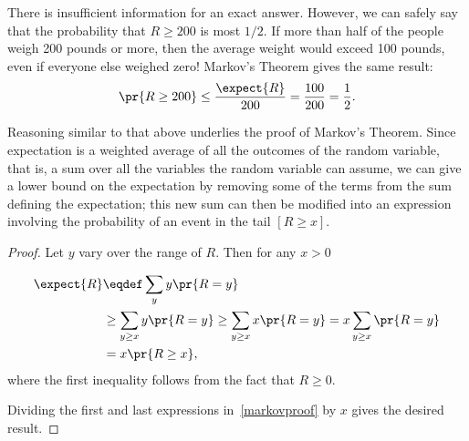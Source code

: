 \begin{editingnotes}
There is insufficient information for an exact answer.  However, we
can safely say that the probability that $R \geq 200$ is most
$1/2$.  If more than half of the people weigh 200 pounds or
more, then the average weight would exceed 100 pounds, even if
everyone else weighed zero!  Markov's Theorem gives the same result:
\begin{displaymath}
  \pr{R \geq 200} \leq \frac{\expect{R}}{200} = \frac{100}{200} = \frac{1}{2}.
\end{displaymath}

Reasoning similar to that above underlies the proof of Markov's
Theorem.  Since expectation is a weighted average of all the outcomes
of the random variable, that is, a sum over all the variables the random
variable can assume, we can give a lower bound on the expectation by
removing some of the terms from the sum defining the expectation; this
new sum can then be modified into an expression involving the
probability of an event in the tail $[R \geq x]$.

\end{editingnotes}

\begin{proof}%
Let $y$ vary over the range of $R$.  Then for any $x > 0$

\iffalse
\begin{align}
  \expect{R}
  & = \expcond{R}{R < x}\pr{R<x} + \expcond{R}{R \geq x}\pr{R \geq x}
       & \text{(total expectation)}\notag\\
  & \geq \expcond{R}{R \geq x}\pr{R \geq x}
       & \text{(because $R \geq 0$)}\notag\\
  & \geq x \pr{R \geq x}.\label{markovproof}
\end{align}
\fi
\iffalse

\begin{align}
  \expect{R}
  & \eqdef \sum_{y} y\pr{R=y}\notag\\
  & \geq \sum_{y \geq x} y\pr{R=y} & \text{(because $R \geq 0$)}\notag\\
  & \geq \sum_{y \geq x} x\pr{R=y}\notag\\
  & = x \sum_{y \geq x} \pr{R=y}\notag\\
  & = x \pr{R \geq x}.\label{markovproof}
\end{align}
\fi

\begin{align}
  \expect{R}
   & \eqdef \sum_{y} y\pr{R=y}\notag\\
   & \geq \sum_{y \geq x} y\pr{R=y}
     \geq \sum_{y \geq x} x\pr{R=y}
      = x \sum_{y \geq x} \pr{R=y}\notag\\
  & = x \pr{R \geq x},\label{markovproof}
\end{align}
where the first inequality follows from the fact that $R \geq 0$.

Dividing the first and last expressions in~\eqref{markovproof} by $x$
gives the desired result.
\end{proof}

